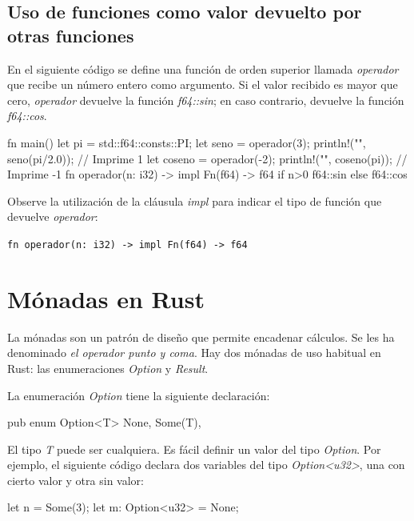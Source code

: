 \subsection{Uso de funciones como valor devuelto por otras funciones}
En el siguiente código se define una función de orden superior llamada \textit{operador} que recibe un número entero como argumento. Si el valor recibido es mayor que cero, \textit{operador} devuelve la función \textit{f64::sin}; en caso contrario, devuelve la función \textit{f64::cos}.

\vspace{0.7em}
\begin{Codigo}
fn main() {
   let pi = std::f64::consts::PI;
   let seno = operador(3);
   println!("{}", seno(pi/2.0)); // Imprime 1
   let coseno = operador(-2);
   println!("{}", coseno(pi)); // Imprime -1
}
fn operador(n: i32) -> impl Fn(f64) -> f64 {
   if n>0 {f64::sin} else {f64::cos}
}
\end{Codigo}

Observe la utilización de la cláusula \textit{impl} para indicar el tipo de función que devuelve \textit{operador}:

{\centering \texttt{fn operador(n: i32) -> impl Fn(f64) -> f64} \par}

\section{Mónadas en Rust}
La mónadas son un patrón de diseño que permite encadenar cálculos. Se les ha denominado \textit{el operador punto y coma}. Hay dos mónadas de uso habitual en Rust: las enumeraciones \textit{Option} y \textit{Result}. 

La enumeración \textit{Option} tiene la siguiente declaración:

\vspace{0.7em}
\begin{Codigo}
   pub enum Option<T> {
      None,
      Some(T),
   }
\end{Codigo}

El tipo \textit{T} puede ser cualquiera. Es fácil definir un valor del tipo \textit{Option}. Por ejemplo, el siguiente código declara dos variables del tipo \textit{Option<u32>}, una con cierto valor y otra sin valor:

\vspace{0.7em}
\begin{Codigo}
   let n = Some(3);
   let m: Option<u32> = None; 
\end{Codigo}

